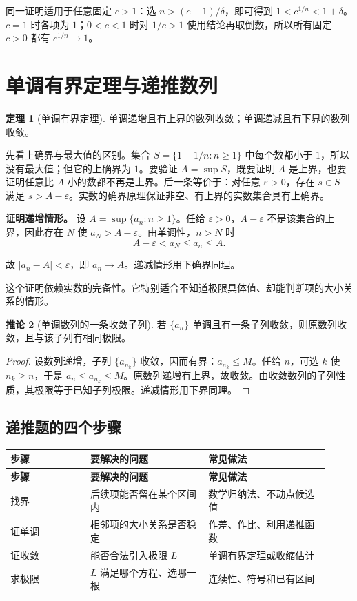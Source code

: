 \documentclass[UTF8,fontset=fandol,12pt,oneside,openany]{ctexrep}
\theoremstyle{definition}
\newtheorem{theorem}{定理}[chapter]
\newtheorem{corollary}[theorem]{推论}
\begin{document}
同一证明适用于任意固定 $c>1$：选 $n>(c-1)/\delta$，即可得到 $1<c^{1/n}<1+\delta$。$c=1$ 时各项为 $1$；$0<c<1$ 时对 $1/c>1$ 使用结论再取倒数，所以所有固定 $c>0$ 都有 $c^{1/n}\to1$。

\section{单调有界定理与递推数列}

\begin{theorem}[单调有界定理]
单调递增且有上界的数列收敛；单调递减且有下界的数列收敛。
\end{theorem}

先看上确界与最大值的区别。集合 $S=\{1-1/n:n\ge1\}$ 中每个数都小于 $1$，所以没有最大值；但它的上确界为 $1$。要验证 $A=\sup S$，既要证明 $A$ 是上界，也要证明任意比 $A$ 小的数都不再是上界。后一条等价于：对任意 $\varepsilon>0$，存在 $s\in S$ 满足 $s>A-\varepsilon$。实数的确界原理保证非空、有上界的实数集合具有上确界。

\textbf{证明递增情形。} 设 $A=\sup\{a_n:n\ge1\}$。任给 $\varepsilon>0$，$A-\varepsilon$ 不是该集合的上界，因此存在 $N$ 使 $a_N>A-\varepsilon$。由单调性，$n>N$ 时
\[
A-\varepsilon<a_N\le a_n\le A.
\]

故 $|a_n-A|<\varepsilon$，即 $a_n\to A$。递减情形用下确界同理。

这个证明依赖实数的完备性。它特别适合不知道极限具体值、却能判断项的大小关系的情形。

\begin{corollary}[单调数列的一条收敛子列]
若 $\{a_n\}$ 单调且有一条子列收敛，则原数列收敛，且与该子列有相同极限。
\end{corollary}
\begin{proof}
设数列递增，子列 $\{a_{n_k}\}$ 收敛，因而有界：$a_{n_k}\le M$。任给 $n$，可选 $k$ 使 $n_k\ge n$，于是 $a_n\le a_{n_k}\le M$。原数列递增有上界，故收敛。由收敛数列的子列性质，其极限等于已知子列极限。递减情形用下界同理。
\end{proof}

\subsection*{递推题的四个步骤}

{\small\begin{longtable}{>{\raggedright\arraybackslash}p{0.23\linewidth}>{\raggedright\arraybackslash}p{0.34\linewidth}>{\raggedright\arraybackslash}p{0.35\linewidth}}
\toprule
\textbf{步骤} & \textbf{要解决的问题} & \textbf{常见做法} \\
\midrule\endfirsthead
\toprule
\textbf{步骤} & \textbf{要解决的问题} & \textbf{常见做法} \\
\midrule\endhead
找界 & 后续项能否留在某个区间内 & 数学归纳法、不动点候选值 \\
证单调 & 相邻项的大小关系是否稳定 & 作差、作比、利用递推函数 \\
证收敛 & 能否合法引入极限 $L$ & 单调有界定理或收缩估计 \\
求极限 & $L$ 满足哪个方程、选哪一根 & 连续性、符号和已有区间 \\
\bottomrule\end{longtable}}
\end{document}
